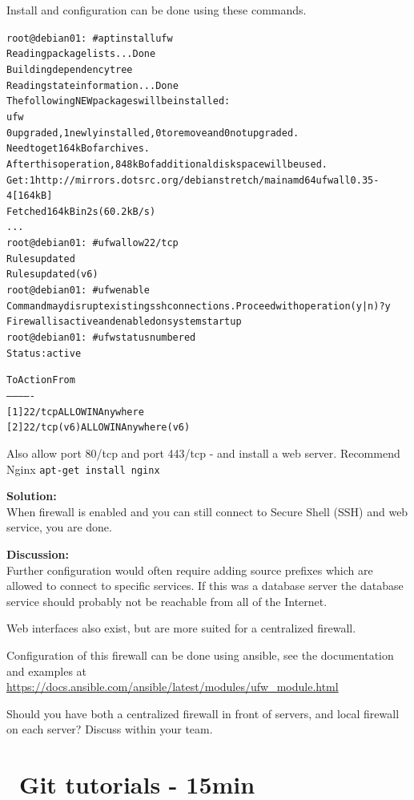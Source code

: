 \documentclass[a4paper,11pt,notitlepage]{report}
\begin{document}
Install and configuration can be done using these commands.
\begin{alltt}
root@debian01:~# apt install ufw
Reading package lists... Done
Building dependency tree
Reading state information... Done
The following NEW packages will be installed:
  ufw
0 upgraded, 1 newly installed, 0 to remove and 0 not upgraded.
Need to get 164 kB of archives.
After this operation, 848 kB of additional disk space will be used.
Get:1 http://mirrors.dotsrc.org/debian stretch/main amd64 ufw all 0.35-4 [164 kB]
Fetched 164 kB in 2s (60.2 kB/s)
...
root@debian01:~# ufw allow 22/tcp
Rules updated
Rules updated (v6)
root@debian01:~# ufw enable
Command may disrupt existing ssh connections. Proceed with operation (y|n)? y
Firewall is active and enabled on system startup
root@debian01:~# ufw status numbered
Status: active

     To                         Action      From
     --                         ------      ----
[ 1] 22/tcp                     ALLOW IN    Anywhere
[ 2] 22/tcp (v6)                ALLOW IN    Anywhere (v6)
\end{alltt}

Also allow port 80/tcp and port 443/tcp - and install a web server. Recommend Nginx \verb+apt-get install nginx+

{\bf Solution:}\\
When firewall is enabled and you can still connect to Secure Shell (SSH) and web service, you are done.

{\bf Discussion:}\\
Further configuration would often require adding source prefixes which are allowed to connect to specific services. If this was a database server the database service should probably not be reachable from all of the Internet.

Web interfaces also exist, but are more suited for a centralized firewall.

Configuration of this firewall can be done using ansible, see the documentation and examples at \url{https://docs.ansible.com/ansible/latest/modules/ufw_module.html}

Should you have both a centralized firewall in front of servers, and local firewall on each server? Discuss within your team.


\chapter{\faExclamationTriangle\ Git tutorials - 15min}
\label{ex:git-tutorial}
\end{document}
